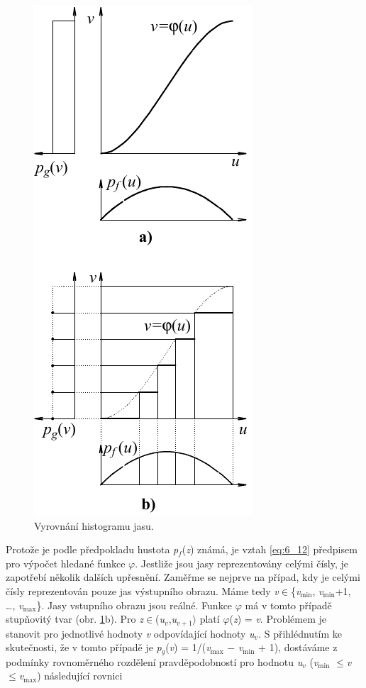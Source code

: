 \begin{figure}[th]
    \begin{center}
        \includegraphics[scale=1.0]{06_bodoveoperace/images/img_6_4.pdf}
    \end{center}
    \caption{Vyrovnání histogramu jasu.}
    \label{img:6_4}
\end{figure}

Protože je podle předpokladu hustota \textit{p}$_f$(\textit{z}) známá, je vztah \eqref{eq:6_12} předpisem pro výpočet hledané funkce $\varphi$. Jestliže jsou jasy reprezentovány celými čísly, je zapotřebí několik dalších upřesnění. Zaměřme se nejprve na případ, kdy je celými čísly reprezentován pouze jas výstupního obrazu. Máme tedy \textit{v}$\in$\{\textit{v}$_{\min}$, \textit{v}$_{\min}$+1, \dots, \textit{v}$_{\max}$\}. Jasy vstupního obrazu jsou reálné. Funkce $\varphi$ má v tomto případě stupňovitý tvar (obr. \ref{img:6_4}b). Pro \textit{z}$\in$(\textit{u}$_v$,\textit{u}$_{v+1}$$\rangle$ platí $\varphi$(\textit{z}) = \textit{v}. Problémem je stanovit pro jednotlivé hodnoty \textit{v} odpovídající hodnoty \textit{u}$_v$. S přihlédnutím ke skutečnosti, že v tomto případě je \textit{p}$_g$(\textit{v}) = 1/(\textit{v}$_{\max}$ $-$ \textit{v}$_{\min}$ + 1), dostáváme z podmínky rovnoměrného rozdělení pravděpodobností pro hodnotu \textit{u}$_v$ (\textit{v}$_{\min}$ $\leq$\textit{v}$\leq$\textit{v}$_{\max}$) následující rovnici

